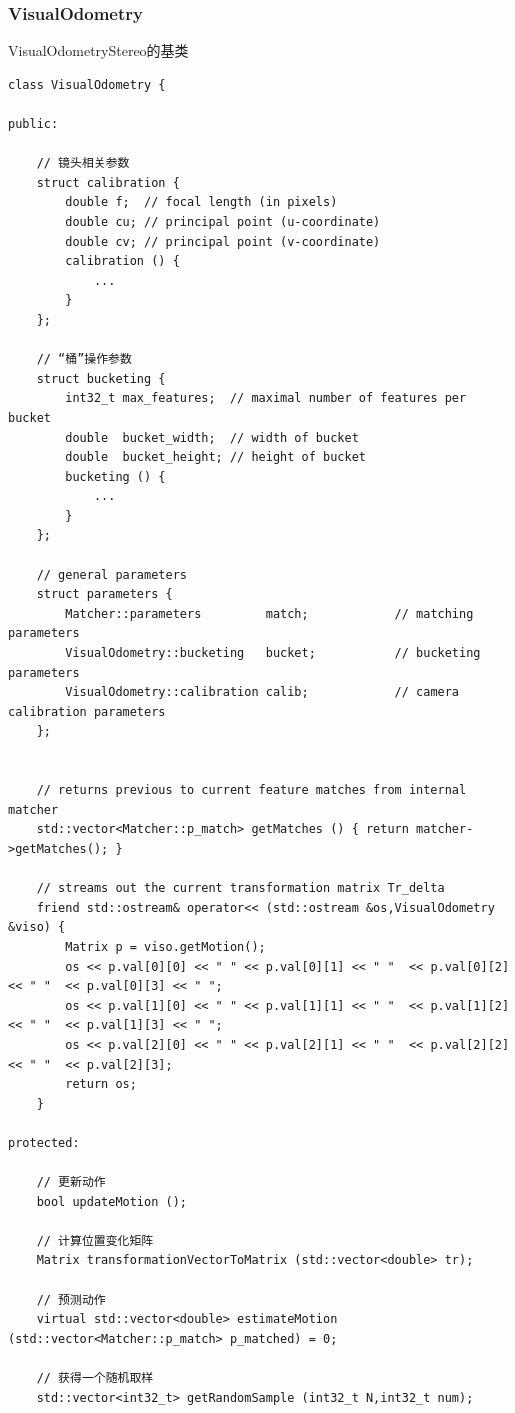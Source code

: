 \documentclass[UTF8]{ctexart}
\begin{document}
    \subsubsection{VisualOdometry}
    VisualOdometryStereo的基类
    \begin{verbatim}
class VisualOdometry {

public:

    // 镜头相关参数
    struct calibration {  
        double f;  // focal length (in pixels)
        double cu; // principal point (u-coordinate)
        double cv; // principal point (v-coordinate)
        calibration () {
            ...
        }
    };
    
    // “桶”操作参数
    struct bucketing {  
        int32_t max_features;  // maximal number of features per bucket 
        double  bucket_width;  // width of bucket
        double  bucket_height; // height of bucket
        bucketing () {
            ...
        }
    };
    
    // general parameters
    struct parameters {
        Matcher::parameters         match;            // matching parameters
        VisualOdometry::bucketing   bucket;           // bucketing parameters
        VisualOdometry::calibration calib;            // camera calibration parameters
    };


    // returns previous to current feature matches from internal matcher
    std::vector<Matcher::p_match> getMatches () { return matcher->getMatches(); }
    
    // streams out the current transformation matrix Tr_delta 
    friend std::ostream& operator<< (std::ostream &os,VisualOdometry &viso) {
        Matrix p = viso.getMotion();
        os << p.val[0][0] << " " << p.val[0][1] << " "  << p.val[0][2]  << " "  << p.val[0][3] << " ";
        os << p.val[1][0] << " " << p.val[1][1] << " "  << p.val[1][2]  << " "  << p.val[1][3] << " ";
        os << p.val[2][0] << " " << p.val[2][1] << " "  << p.val[2][2]  << " "  << p.val[2][3];
        return os;
    }
    
protected:

    // 更新动作
    bool updateMotion ();

    // 计算位置变化矩阵
    Matrix transformationVectorToMatrix (std::vector<double> tr);

    // 预测动作
    virtual std::vector<double> estimateMotion (std::vector<Matcher::p_match> p_matched) = 0;
    
    // 获得一个随机取样
    std::vector<int32_t> getRandomSample (int32_t N,int32_t num);


\end{verbatim}
\end{document}
